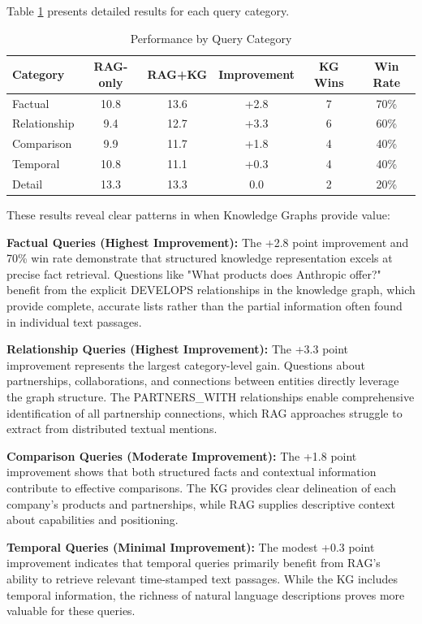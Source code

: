 \documentclass[11pt,twocolumn]{article}
\begin{document}
Table \ref{tab:category_results} presents detailed results for each query category.

\begin{table}[t]
\centering
\caption{Performance by Query Category}
\label{tab:category_results}
\begin{tabular}{lccccc}
\toprule
\textbf{Category} & \textbf{RAG-only} & \textbf{RAG+KG} & \textbf{Improvement} & \textbf{KG Wins} & \textbf{Win Rate} \\
\midrule
Factual & 10.8 & 13.6 & +2.8 & 7 & 70\% \\
Relationship & 9.4 & 12.7 & +3.3 & 6 & 60\% \\
Comparison & 9.9 & 11.7 & +1.8 & 4 & 40\% \\
Temporal & 10.8 & 11.1 & +0.3 & 4 & 40\% \\
Detail & 13.3 & 13.3 & 0.0 & 2 & 20\% \\
\bottomrule
\end{tabular}
\end{table}

These results reveal clear patterns in when Knowledge Graphs provide value:

\textbf{Factual Queries (Highest Improvement):} The +2.8 point improvement and 70\% win rate demonstrate that structured knowledge representation excels at precise fact retrieval. Questions like "What products does Anthropic offer?" benefit from the explicit DEVELOPS relationships in the knowledge graph, which provide complete, accurate lists rather than the partial information often found in individual text passages.

\textbf{Relationship Queries (Highest Improvement):} The +3.3 point improvement represents the largest category-level gain. Questions about partnerships, collaborations, and connections between entities directly leverage the graph structure. The PARTNERS\_WITH relationships enable comprehensive identification of all partnership connections, which RAG approaches struggle to extract from distributed textual mentions.

\textbf{Comparison Queries (Moderate Improvement):} The +1.8 point improvement shows that both structured facts and contextual information contribute to effective comparisons. The KG provides clear delineation of each company's products and partnerships, while RAG supplies descriptive context about capabilities and positioning.

\textbf{Temporal Queries (Minimal Improvement):} The modest +0.3 point improvement indicates that temporal queries primarily benefit from RAG's ability to retrieve relevant time-stamped text passages. While the KG includes temporal information, the richness of natural language descriptions proves more valuable for these queries.
\end{document}
